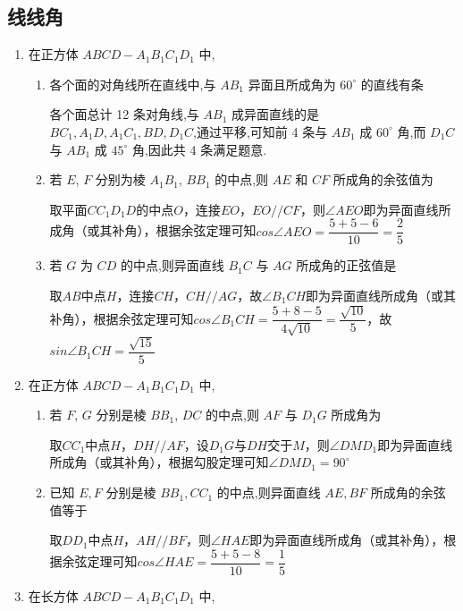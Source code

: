 \subsection*{线线角}
\begin{enumerate}
    \item 在正方体 ${ABCD} - {A}_{1}{B}_{1}{C}_{1}{D}_{1}$ 中,
    \begin{enumerate}
        \item 各个面的对角线所在直线中,与 $A{B}_{1}$ 异面且所成角为 ${60}^{ \circ  }$ 的直线有条
        \begin{jieda}
            各个面总计 12 条对角线,与 $A{B}_{1}$ 成异面直线的是 $B{C}_{1},{A}_{1}D,{A}_{1}{C}_{1},{BD},{D}_{1}C$,通过平移,可知前 4 条与 $A{B}_{1}$ 成 ${60}^{ \circ  }$ 角,而 ${D}_{1}C$ 与 $A{B}_{1}$ 成 ${45}^{ \circ  }$ 角,因此共 4 条满足题意.
        \end{jieda}
        \item 若 $E$, $F$ 分别为棱 ${A}_{1}{B}_{1}$, $B{B}_{1}$ 的中点,则 ${AE}$ 和 ${CF}$ 所成角的余弦值为
        \begin{jieda}
            取平面$CC_1D_1D$的中点$O$，连接$EO$，$EO // CF$，则$\angle{AEO}$即为异面直线所成角（或其补角），根据余弦定理可知$cos\angle{AEO} = \dfrac{5+5-6}{10} = \dfrac{2}{5}$
        \end{jieda}
        \item 若 $G$ 为 ${CD}$ 的中点,则异面直线 ${B}_{1}C$ 与 ${AG}$ 所成角的正弦值是
        \begin{jieda}
            取$AB$中点$H$，连接$CH$，$CH // AG$，故$\angle{B_1CH}$即为异面直线所成角（或其补角），根据余弦定理可知$cos\angle{B_1CH} = \dfrac{5+8-5}{4\sqrt{10}} = \dfrac{\sqrt{10}}{5}$，故$sin\angle{B_1CH} = \dfrac{\sqrt{15}}{5}$
        \end{jieda}
    \end{enumerate}
    \item 在正方体 ${ABCD} - {A}_{1}{B}_{1}{C}_{1}{D}_{1}$ 中,
    \begin{enumerate}
        \item 若 $F$, $G$ 分别是棱 $B{B}_{1}$, ${DC}$ 的中点,则 ${AF}$ 与 ${D}_{1}G$ 所成角为
        \begin{jieda}
            取$CC_1$中点$H$，$DH // AF$，设$D_1G$与$DH$交于$M$，则$\angle{DMD_1}$即为异面直线所成角（或其补角），根据勾股定理可知$\angle{DMD_1} = 90^{\circ}$
        \end{jieda}
        \item 已知 $E,F$ 分别是棱 $B{B}_{1},C{C}_{1}$ 的中点,则异面直线 ${AE},{BF}$ 所成角的余弦值等于
        \begin{jieda}
            取$DD_1$中点$H$，$AH // BF$，则$\angle{HAE}$即为异面直线所成角（或其补角），根据余弦定理可知$cos\angle{HAE} = \dfrac{5+5-8}{10} = \dfrac{1}{5}$
        \end{jieda}
    \end{enumerate}
    \item  在长方体 ${ABCD} - {A}_{1}{B}_{1}{C}_{1}{D}_{1}$ 中,
    

\end{enumerate}
